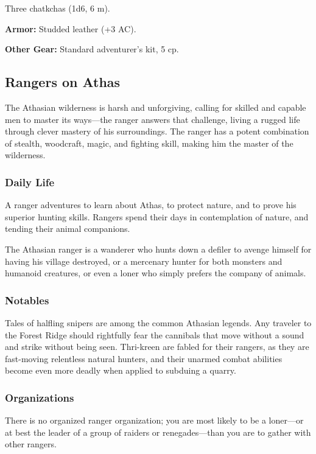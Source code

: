 Three chatkchas (1d6, 6 m).

\textbf{Armor:} Studded leather (+3 AC).

\textbf{Other Gear:} Standard adventurer's kit, 5 cp.

\subsection{Rangers on Athas}

The Athasian wilderness is harsh and unforgiving, calling for skilled and capable men to master its ways---the ranger answers that challenge, living a rugged life through clever mastery of his surroundings. The ranger has a potent combination of stealth, woodcraft, magic, and fighting skill, making him the master of the wilderness.

\subsubsection{Daily Life}
A ranger adventures to learn about Athas, to protect nature, and to prove his superior hunting skills. Rangers spend their days in contemplation of nature, and tending their animal companions.

The Athasian ranger is a wanderer who hunts down a defiler to avenge himself for having his village destroyed, or a mercenary hunter for both monsters and humanoid creatures, or even a loner who simply prefers the company of animals.

\subsubsection{Notables}
Tales of halfling snipers are among the common Athasian legends. Any traveler to the Forest Ridge should rightfully fear the cannibals that move without a sound and strike without being seen. Thri-kreen are fabled for their rangers, as they are fast-moving relentless natural hunters, and their unarmed combat abilities become even more deadly when applied to subduing a quarry.

\subsubsection{Organizations}
There is no organized ranger organization; you are most likely to be a loner---or at best the leader of a group of raiders or renegades---than you are to gather with other rangers.

